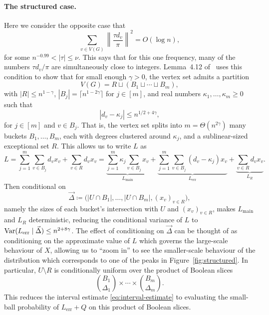 \paragraph{The structured case.} Here we consider the opposite case that
\[
  \sum_{v \in V(G)} \left\|\frac{\tau d_v}{\pi}\right\|^2 = O(\log n),
\]
for some $n^{-0.99} < |\tau| \leq \nu$. This says that for this one frequency, many of the numbers $\tau d_v/\pi$ are simultaneously close to integers. Lemma~4.12 of~\cite{Kwan_2023} uses this condition to show that for small enough $\gamma > 0$, the vertex set admits a partition
\begin{equation}
  \label{eq:partition}
  V(G) = R \sqcup (B_1 \sqcup \cdots \sqcup B_m),
\end{equation}
with $|R| \leq n^{1-\gamma}$, $|B_j| = \lceil n^{1-2\gamma}\rceil$ for $j \in [m]$, and real numbers $\kappa_1, \dots, \kappa_m \geq 0$ such that
\[
  |d_v - \kappa_j| \leq n^{1/2 + 4\gamma},
\]
for $j \in [m]$ and $v \in B_j$. That is, the vertex set splits into $m = \Theta(n^{2\gamma})$ many buckets $B_1, \dots, B_m$, each with degrees clustered around $\kappa_j$, and a sublinear-sized exceptional set $R$. This allows us to write $L$ as
\[
 L = \sum_{j = 1}^m \sum_{v \in B_j} d_vx_v + \sum_{v \in R} d_v x_v = \underbrace{\sum_{j = 1}^m \kappa_j \sum_{v \in B_j} x_v}_{L_{\text{main}}} + \underbrace{\sum_{j = 1}^m \sum_{v \in B_j} (d_v - \kappa_j)x_v}_{L_{\text{err}}} + \underbrace{\sum_{v \in R} d_v x_v}_{L_{R}}.
\]
Then conditional on
\[
  \vec\Delta \coloneqq \bigl(|U \cap B_1|, \dots, |U \cap B_m|, (x_v)_{v \in R}\bigr),
\]
namely the sizes of each bucket's intersection with $U$ and $(x_v)_{v \in R}$, makes $L_{\text{main}}$ and $L_{R}$ deterministic, reducing the conditional variance of $L$ to $\operatorname{Var}(L_{\text{err}} \mid \vec\Delta) \leq n^{2 + 8\gamma}$. The effect of conditioning on $\vec\Delta$ can be thought of as conditioning on the approximate value of $L$ which governs the large-scale behaviour of $X$, allowing us to ``zoom in'' to see the smaller-scale behaviour of the distribution which corresponds to one of the peaks in Figure~\ref{fig:structured}. In particular, $U \setminus R$ is conditionally uniform over the product of Boolean slices
\[
  \binom{B_1}{\Delta_1} \times \cdots \times \binom{B_m}{\Delta_m}.
\]
This reduces the interval estimate \eqref{eq:interval-estimate} to evaluating the small-ball probability of $L_{\text{err}} + Q$ on this product of Boolean slices.

